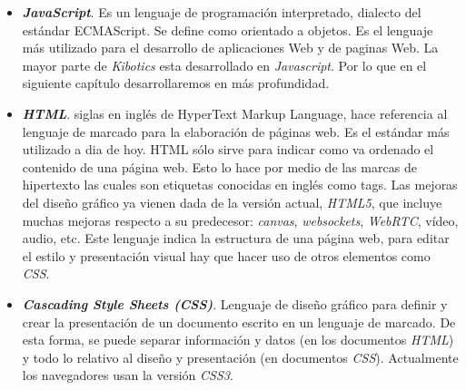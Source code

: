 \begin{itemize} 
    \item \textit{\textbf{JavaScript}}. Es un lenguaje de programación interpretado, dialecto del estándar ECMAScript. Se define como orientado a objetos. Es el lenguaje más utilizado para el desarrollo de aplicaciones Web y de paginas Web. La mayor parte de \textit{Kibotics} esta desarrollado en \textit{Javascript}. Por lo que en el siguiente capítulo desarrollaremos en más profundidad.
    \item \textit{\textbf{HTML}}. siglas en inglés de HyperText Markup Language, hace referencia al lenguaje de marcado para la elaboración de páginas web. Es el estándar más utilizado a dia de hoy.\newline
HTML sólo sirve para indicar como va ordenado el contenido de una página web. Esto lo hace por medio de las marcas de hipertexto las cuales son etiquetas conocidas en inglés como tags. Las mejoras del diseño gráfico ya vienen dada de la versión actual, \textit{HTML5}, que incluye muchas mejoras respecto a su predecesor: \textit{canvas}, \textit{websockets}, \textit{WebRTC}, vídeo, audio, etc. Este lenguaje indica la estructura de una página web, para editar el estilo y presentación visual hay que hacer uso de otros elementos como \textit{CSS}.
    \item \textit{\textbf{Cascading Style Sheets (CSS)}}. Lenguaje de diseño gráfico para definir y crear la presentación de un documento escrito en un lenguaje de marcado. De esta forma, se puede separar información y datos (en los documentos \textit{HTML}) y todo lo relativo al diseño y presentación (en documentos \textit{CSS}). Actualmente los navegadores usan la versión \textit{CSS3}.

\end{itemize}


